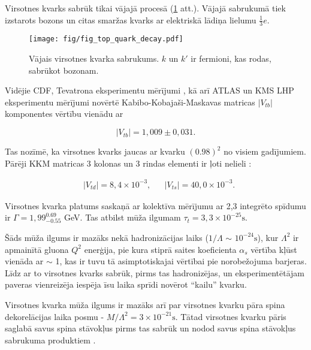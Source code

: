 Virsotnes kvarks sabrūk tikai vājajā procesā (\ref{fig:quark_decay} att.). Vājajā sabrukumā tiek izstarots \PW bozons un citas \gls{smaržas} kvarks ar elektriskā lādiņa lielumu  $\frac{1}{3}e$. 

\begin{figure}[H]
  \centering
  \texttt{[image: fig/fig\_top\_quark\_decay.pdf]}
  \caption{Vājais virsotnes kvarka \cPqt sabrukums. $k$ un $k'$ ir fermioni, kas rodas, sabrūkot \PW bozonam.}
  \label{fig:quark_decay}
\end{figure}

Vidējie CDF, \DZERO Tevatrona eksperimentu mērījumi \cite{Aaltonen:2015cra}, kā arī ATLAS un KMS LHP eksperimentu mērījumi \cite{twiki:tt_curve_toplhcwg_sep18} novērtē Kabibo-Kobajaši-Maskavas matricas $|V_{tb}|$ komponentes vērtību vienādu ar

\begin{equation}
  |V_{tb}|=1,009\pm0,031.
\end{equation}

Tas nozīmē, ka virsotnes kvarks jaucas ar \cPqb kvarku $(0.98)^{2}$ no visiem gadījumiem. Pārēji KKM matricas 3 kolonas un 3 rindas elementi ir ļoti nelieli \cite{Patrignani:2016xqp}:

\begin{align}
  & |V_{td}|=8,4\times10^{-3}, && |V_{ts}|=40,0\times10^{-3}.
\end{align}

Virsotnes kvarka platums saskaņā ar \DZERO kolektīva mērījumu \cite{Abazov:2010tm} ar 2,3 \fbinv integrēto spīdumu ir $\Gamma=1,99^{0.69}_{-0.55}$ GeV. Tas atbilst mūža ilgumam $\tau_{t}=3,3\times10^{-25}\text{s}$.

Šāds mūža ilgums ir mazāks nekā hadronizācijas laiks ($1/\Lambda$ $\sim$ $10^{-24}\text{s}$), kur $\Lambda^{2}$ ir apmainītā gluona $Q^{2}$ enerģija, pie kura stiprā saites koeficienta $\alpha_{s}$ vērtība kļūst vienāda ar $\sim$ 1, kas ir tuvu tā asimptotiskajai vērtībai pie \gls{norobežojuma barjeras}. Līdz ar to virsotnes kvarks sabrūk, pirms tas hadronizējas, un eksperimentētājam paveras vienreizēja iespēja īsu laika sprīdi novērot ``kailu'' kvarku.

Virsotnes kvarka mūža ilgums ir mazāks arī par virsotnes kvarku pāra spina dekorelācijas laika posmu - $M/{\Lambda^{2}}=3\times 10^{-21}\text{s}$. Tātad virsotnes kvarku pāris saglabā savus spina stāvokļus pirms tas sabrūk un nodod savus spina stāvokļus sabrukuma produktiem \cite{Cristinziani:2016vif}.

